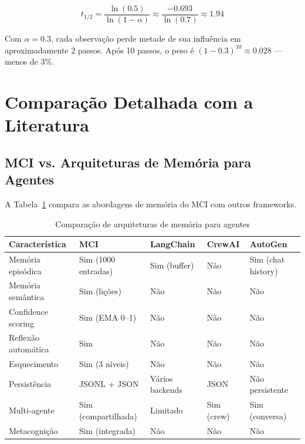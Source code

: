 \begin{equation}
t_{1/2} = \frac{\ln(0.5)}{\ln(1-\alpha)} \approx \frac{-0.693}{\ln(0.7)} \approx 1.94
\end{equation}

Com $\alpha = 0.3$, cada observação perde metade de sua influência em aproximadamente 2 passos. Após 10 passos, o peso é $(1-0.3)^{10} \approx 0.028$ — menos de 3\%.

\section{Comparação Detalhada com a Literatura}
\label{sec:literature-comparison}

\subsection{MCI vs. Arquiteturas de Memória para Agentes}

A Tabela~\ref{tab:memory-comparison} compara as abordagens de memória do MCI com outros frameworks.

\begin{table}[htbp]
\centering
\caption{Comparação de arquiteturas de memória para agentes}
\label{tab:memory-comparison}
\begin{tabular}{@{}p{2.5cm}p{2.5cm}p{2.5cm}p{2.5cm}p{2.5cm}@{}}
\toprule
\textbf{Característica} & \textbf{MCI} & \textbf{LangChain} & \textbf{CrewAI} & \textbf{AutoGen} \\
\midrule
Memória episódica & Sim (1000 entradas) & Sim (buffer) & Não & Sim (chat history) \\
Memória semântica & Sim (lições) & Não & Não & Não \\
Confidence scoring & Sim (EMA 0--1) & Não & Não & Não \\
Reflexão automática & Sim & Não & Não & Não \\
Esquecimento & Sim (3 níveis) & Não & Não & Não \\
Persistência & JSONL + JSON & Vários backends & JSON & Não persistente \\
Multi-agente & Sim (compartilhada) & Limitado & Sim (crew) & Sim (conversa) \\
Metacognição & Sim (integrada) & Não & Não & Não \\
\bottomrule
\end{tabular}
\end{table}

